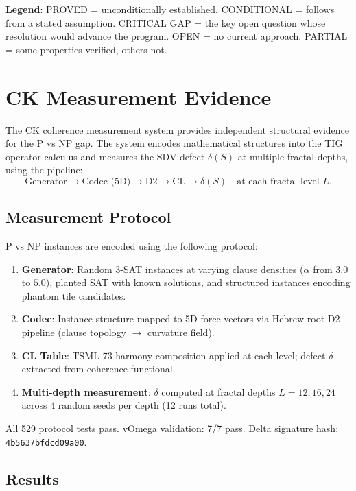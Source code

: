 \documentclass[11pt]{article}
\theoremstyle{definition}
\theoremstyle{remark}
\begin{document}
\noindent
\textbf{Legend}: PROVED = unconditionally established.  CONDITIONAL = follows
from a stated assumption.  CRITICAL GAP = the key open question whose
resolution would advance the program.  OPEN = no current approach.
PARTIAL = some properties verified, others not.

\section{CK Measurement Evidence}
\label{sec:ck}

The CK coherence measurement system provides independent structural evidence
for the P vs NP gap.  The system encodes mathematical structures into the
TIG operator calculus and measures the SDV defect $\delta(S)$ at multiple
fractal depths, using the pipeline:
\[
  \text{Generator} \to \text{Codec (5D)} \to \text{D2} \to \text{CL} \to \delta(S)
  \quad \text{at each fractal level } L.
\]

\subsection{Measurement Protocol}

P vs NP instances are encoded using the following protocol:
\begin{enumerate}
  \item \textbf{Generator}: Random 3-SAT instances at varying clause densities
    ($\alpha$ from $3.0$ to $5.0$), planted SAT with known solutions, and
    structured instances encoding phantom tile candidates.
  \item \textbf{Codec}: Instance structure mapped to 5D force vectors via
    Hebrew-root D2 pipeline (clause topology $\to$ curvature field).
  \item \textbf{CL Table}: TSML 73-harmony composition applied at each level;
    defect $\delta$ extracted from coherence functional.
  \item \textbf{Multi-depth measurement}: $\delta$ computed at fractal depths
    $L = 12, 16, 24$ across 4 random seeds per depth (12 runs total).
\end{enumerate}

All 529 protocol tests pass.  vOmega validation: 7/7 pass.
Delta signature hash: \texttt{4b5637bfdcd09a00}.

\subsection{Results}
\end{document}
